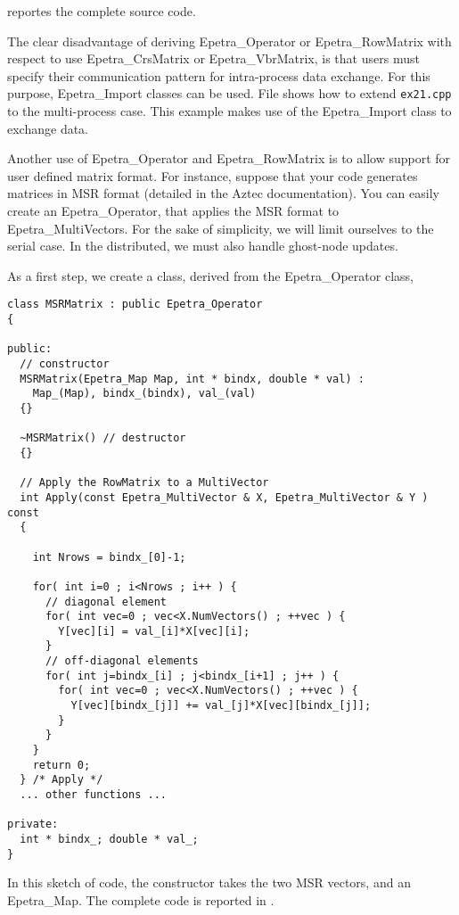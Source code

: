  reportes the complete source code.

\begin{remark}
  The clear disadvantage of deriving Epetra\_Operator or
  Epetra\_RowMatrix with respect to use Epetra\_CrsMatrix or
  Epetra\_VbrMatrix, is that users must specify their communication
  pattern for intra-process data exchange. For this purpose,
  Epetra\_Import classes can be used.  File 
  shows how to extend \verb!ex21.cpp! to the multi-process case. This
  example makes use of the Epetra\_Import class to exchange data.
\end{remark}


Another use of Epetra\_Operator and Epetra\_RowMatrix is to allow
support for user defined matrix format. For instance, suppose that your
code generates matrices in MSR format (detailed in the Aztec
documentation). You can easily create an Epetra\_Operator, that applies
the MSR format to Epetra\_MultiVectors. For the sake of simplicity, we
will limit ourselves to the serial case. In the distributed, we must
also handle ghost-node updates.

As a first step, we create a class, derived from the Epetra\_Operator
class,
\begin{verbatim}
class MSRMatrix : public Epetra_Operator 
{

public:
  // constructor
  MSRMatrix(Epetra_Map Map, int * bindx, double * val) :
    Map_(Map), bindx_(bindx), val_(val) 
  {}

  ~MSRMatrix() // destructor
  {}

  // Apply the RowMatrix to a MultiVector
  int Apply(const Epetra_MultiVector & X, Epetra_MultiVector & Y ) const 
  {

    int Nrows = bindx_[0]-1;
    
    for( int i=0 ; i<Nrows ; i++ ) {
      // diagonal element
      for( int vec=0 ; vec<X.NumVectors() ; ++vec ) {
        Y[vec][i] = val_[i]*X[vec][i];
      }
      // off-diagonal elements
      for( int j=bindx_[i] ; j<bindx_[i+1] ; j++ ) {
        for( int vec=0 ; vec<X.NumVectors() ; ++vec ) {
          Y[vec][bindx_[j]] += val_[j]*X[vec][bindx_[j]];
        }
      }
    }
    return 0;
  } /* Apply */
  ... other functions ...

private:
  int * bindx_; double * val_;
}
\end{verbatim}
In this sketch of code, the constructor takes the two MSR vectors, and
an Epetra\_Map. The complete code is reported in \newline
{}.

